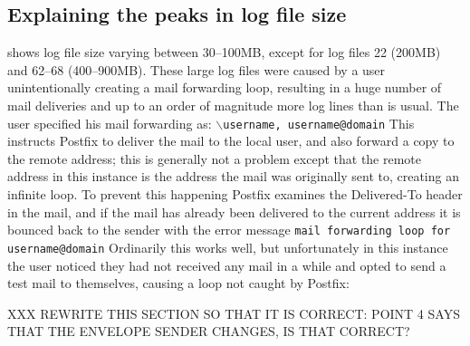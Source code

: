 

\subsection{Explaining the peaks in log file size}

\label{Explaining the peaks in log file size}

 shows log
file size varying between 30--100MB, except for log files 22 (200MB) and
62--68 (400--900MB).  These large log files were caused by a user
unintentionally creating a mail forwarding loop, resulting in a huge number
of mail deliveries and up to an order of magnitude more log lines than is
usual.  The user specified his mail forwarding as: \newline{}
\tab{}\texttt{$\backslash$username, username@domain} \newline{} This
instructs Postfix to deliver the mail to the local user, and also forward a
copy to the remote address; this is generally not a problem except that the
remote address in this instance is the address the mail was originally sent
to, creating an infinite loop.  To prevent this happening Postfix examines
the Delivered-To header in the mail, and if the mail has already been
delivered to the current address it is bounced back to the sender with the
error message \newline{} \tab{} \texttt{mail forwarding loop for
username@domain}\newline{}  Ordinarily this works well, but unfortunately
in this instance the user noticed they had not received any mail in a while
and opted to send a test mail to themselves, causing a loop not caught by
Postfix:

XXX REWRITE THIS SECTION SO THAT IT IS CORRECT\@: POINT 4 SAYS THAT THE
ENVELOPE SENDER CHANGES, IS THAT CORRECT\@?

